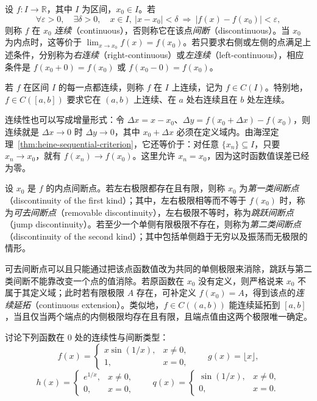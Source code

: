 \begin{definition}
\label{def:continuity-at-a-point-and-on-intervals}
设 $f:I\to\mathbb{R}$，其中 $I$ 为区间，$x_0\in I$。若
\begin{equation}
    \forall\varepsilon>0,\quad\exists\delta>0,\quad
    x\in I,\ |x-x_0|<\delta
    \ \Longrightarrow\ |f(x)-f(x_0)|<\varepsilon,
    \label{eq:epsilon-delta-continuity}
\end{equation}
则称 $f$ 在 $x_0$ \emph{连续}（continuous），否则称它在该点\emph{间断}（discontinuous）。当 $x_0$ 为内点时，这等价于 $\lim_{x\to x_0}f(x)=f(x_0)$。若只要求右侧或左侧的点满足上述条件，分别称为\emph{右连续}（right-continuous）或\emph{左连续}（left-continuous），相应条件是 $f(x_0+0)=f(x_0)$ 或 $f(x_0-0)=f(x_0)$。

若 $f$ 在区间 $I$ 的每一点都连续，则称 $f$ 在 $I$ 上连续，记为 $f\in C(I)$。特别地，$f\in C([a,b])$ 要求它在 $(a,b)$ 上连续、在 $a$ 处右连续且在 $b$ 处左连续。
\end{definition}

连续性也可以写成增量形式：令 $\Delta x=x-x_0$、$\Delta y=f(x_0+\Delta x)-f(x_0)$，则连续就是 $\Delta x\to0$ 时 $\Delta y\to0$，其中 $x_0+\Delta x$ 必须在定义域内。由海涅定理~\ref{thm:heine-sequential-criterion}，它还等价于：对任意 $\{x_n\}\subseteq I$，只要 $x_n\to x_0$，就有 $f(x_n)\to f(x_0)$。这里允许 $x_n=x_0$，因为这时函数值误差已经为零。

\begin{definition}
\label{def:classification-of-discontinuities}
设 $x_0$ 是 $f$ 的内点间断点。若左右极限都存在且有限，则称 $x_0$ 为\emph{第一类间断点}（discontinuity of the first kind）；其中，左右极限相等而不等于 $f(x_0)$ 时，称为\emph{可去间断点}（removable discontinuity），左右极限不等时，称为\emph{跳跃间断点}（jump discontinuity）。若至少一个单侧有限极限不存在，则称为\emph{第二类间断点}（discontinuity of the second kind）；其中包括单侧趋于无穷以及振荡而无极限的情形。
\end{definition}

可去间断点可以且只能通过把该点函数值改为共同的单侧极限来消除，跳跃与第二类间断不能靠改变一个点的值消除。若原函数在 $x_0$ 没有定义，则严格说来 $x_0$ 不属于其定义域；此时若有限极限 $A$ 存在，可补定义 $f(x_0)=A$，得到该点的\emph{连续延拓}（continuous extension）。类似地，$f\in C((a,b))$ 能连续延拓到 $[a,b]$，当且仅当两个端点的内侧极限均存在且有限，且端点值由这两个极限唯一确定。

\begin{example}
\label{ex:types-of-discontinuities}
讨论下列函数在 $0$ 处的连续性与间断类型：
\[
    f(x)=\begin{cases}x\sin(1/x),&x\neq0,\\1,&x=0,\end{cases}
    \qquad g(x)=\lfloor x\rfloor,
\]
\[
    h(x)=\begin{cases}e^{1/x},&x\neq0,\\0,&x=0,\end{cases}
    \qquad q(x)=\begin{cases}\sin(1/x),&x\neq0,\\0,&x=0.\end{cases}
\]
\end{example}

